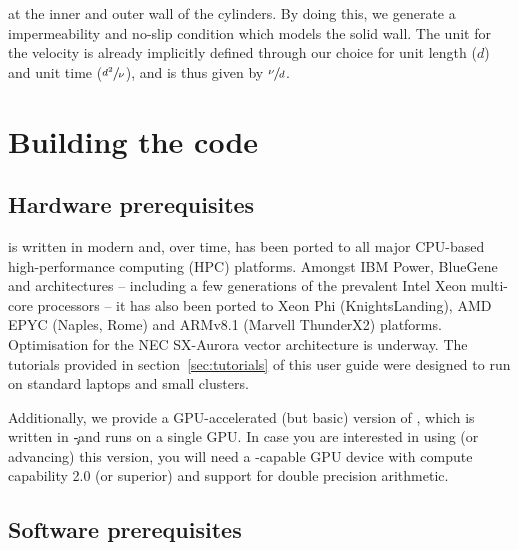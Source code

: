 \documentclass[a4paper, 11pt, DIV=11]{scrartcl}
\begin{document}
at the inner and outer wall of the cylinders. By doing this, we generate a
impermeability and no-slip condition which models the solid wall. The unit
for the velocity is already implicitly defined through our choice for unit
length ($d$) and unit time ($\sfrac{d^2}{\nu}$), and is thus given by
$\sfrac{\nu}{d}$.
\par
{}



\section{Building the code}
\label{sec:buildingTheCode}

\subsection{Hardware prerequisites}
\label{sec:hardwarePrerequisites}

\nsc is written in modern \fortran and, over time, has been ported to all major
CPU-based high-performance computing (HPC) platforms. Amongst IBM Power,
BlueGene and  architectures -- including a few generations
of the prevalent Intel Xeon multi-core processors -- it has also been
ported to Xeon Phi (KnightsLanding), AMD EPYC (Naples, Rome) and ARMv8.1
(Marvell ThunderX2) platforms. Optimisation for the NEC SX-Aurora vector
architecture is underway. The tutorials provided in section~\ref{sec:tutorials} of
this user guide were designed to run on standard laptops and small clusters.
\par
Additionally, we provide a GPU-accelerated (but basic) version of \nsc, which is
written in \c-\cuda and runs on a single GPU. In case you are interested in using
(or advancing) this version, you will need a \cuda-capable GPU device with compute
capability 2.0 (or superior) and support for double precision arithmetic.

\subsection{Software prerequisites}
\label{sec:softwarePrerequisites}
\end{document}
